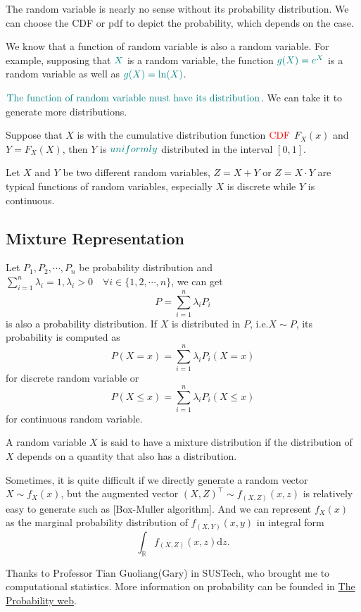 \documentclass[titlestyle=hang,11pt]{elegantbook}
\begin{document}
The random variable is nearly no sense without its probability distribution. We can choose the CDF or pdf to depict the probability, which depends on the case.

We know that a function of random variable is also a random variable.
For example, supposing that $\color{teal}{X}$ is a random variable, the function $\color{teal}{g(X)= e^{X}}$ is a random variable as well as $\color{teal}{g(X)=\ln(X)}$.

$\color{teal}{\text{The function of random variable must have its distribution}}$.
We can take it to generate more distributions.
\begin{theorem}
Suppose that $X$  is with the cumulative distribution function $\color{red}{\text{CDF}}$ $F_X(x)$ and $Y=F_X(X)$, then $Y$ is $\color{teal}{uniformly}$ distributed in the interval $[0, 1]$.
\end{theorem}
Let $X$ and $Y$ be two different random variables, $Z= X+Y$ or $Z = X\cdot Y$ are typical functions of random variables, especially $X$ is discrete while $Y$ is continuous.

\subsection{Mixture Representation}

Let $P_1,P_2,\cdots, P_n$ be probability distribution and $\sum_{i=1}^{n}\lambda_i=1,\lambda_i > 0 \quad \forall i\in\{1,2,\cdots,n\}$, we can get
\[ P=\sum_{i=1}^{n}\lambda_iP_i \]
is also a probability distribution.
If $X$ is  distributed in $P$, i.e.$X\sim P$, its probability is computed as
\[ P(X=x)=\sum_{i=1}^{n}\lambda_iP_i(X=x) \]
for discrete random variable or
\[ P(X\leq x)=\sum_{i=1}^{n}\lambda_iP_i(X\leq x) \]
for continuous random variable.

 A random variable $X$ is said to have a mixture distribution if the distribution of $X$ depends on a quantity that also has a distribution.


Sometimes, it is quite difficult if we directly generate a random vector $X\sim f_X(x)$, but the augmented vector $(X, Z)
^⊤\sim f_{(X,Z)}(x, z)$ is relatively easy to generate such as [Box-Muller algorithm].
And we can represent $f_X(x)$ as the marginal probability distribution of $f_{(X,Y)}(x,y)$ in integral form
\[ \int_{\mathbb{R}}f_{(X,Z)}(x,z) \mathrm{d}z. \]


Thanks to Professor Tian Guoliang(Gary) in SUSTech, who brought me to computational statistics.
More information on probability can be founded in \href{http://probweb.berkeley.edu/probweb.html}{The Probability web}.
\end{document}
